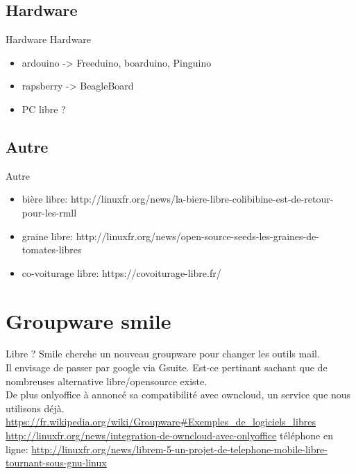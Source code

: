 \documentclass{beamer}
\begin{document}
\subsection{Hardware}
\begin{frame}{Hardware} 
Hardware
\begin{itemize}
	\item ardouino -> Freeduino, boarduino, Pinguino
	\item rapsberry -> BeagleBoard
	\item PC libre ?
\end{itemize}
\end{frame}

\subsection{Autre}
\begin{frame}{Autre} 
\begin{itemize}
	\item bière libre: http://linuxfr.org/news/la-biere-libre-colibibine-est-de-retour-pour-les-rmll
	\item graine libre: http://linuxfr.org/news/open-source-seeds-les-graines-de-tomates-libres
	\item co-voiturage libre: https://covoiturage-libre.fr/
\end{itemize}
\end{frame}




\section{Groupware smile}
\begin{frame}{Libre ?}
Smile cherche un nouveau groupware pour changer les outils mail.\\
Il envisage de passer par google via Gsuite. Est-ce pertinant sachant que de nombreuses alternative libre/opensource existe.\\
De plus onlyoffice à annoncé sa compatibilité avec owncloud, un service que nous utilisons déjà.\\
\url{https://fr.wikipedia.org/wiki/Groupware\#Exemples\_de\_logiciels\_libres}
\\
\url{http://linuxfr.org/news/integration-de-owncloud-avec-onlyoffice}
\newline
téléphone en ligne: 
\url{http://linuxfr.org/news/librem-5-un-projet-de-telephone-mobile-libre-tournant-sous-gnu-linux}
\end{frame}
\end{document}
